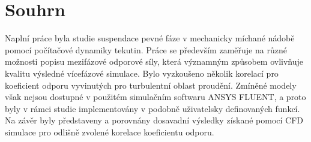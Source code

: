 \section*{Souhrn}
\vspace{3mm}
Naplní práce byla studie suspendace pevné fáze v mechanicky míchané nádobě pomocí počítačové dynamiky tekutin. Práce se především zaměřuje na různé možnosti popisu mezifázové odporové síly, která významným způsobem ovlivňuje kvalitu výsledné vícefázové simulace. Bylo vyzkoušeno několik korelací pro koeficient odporu vyvinutých pro turbulentní oblast proudění. Zmíněné modely však nejsou dostupné v použitém simulačním softwaru ANSYS FLUENT, a proto byly v rámci studie implementovány v podobně uživatelsky definovaných funkcí. Na závěr byly představeny a porovnány dosavadní výsledky získané pomocí CFD simulace pro odlišně zvolené korelace koeficientu odporu.

